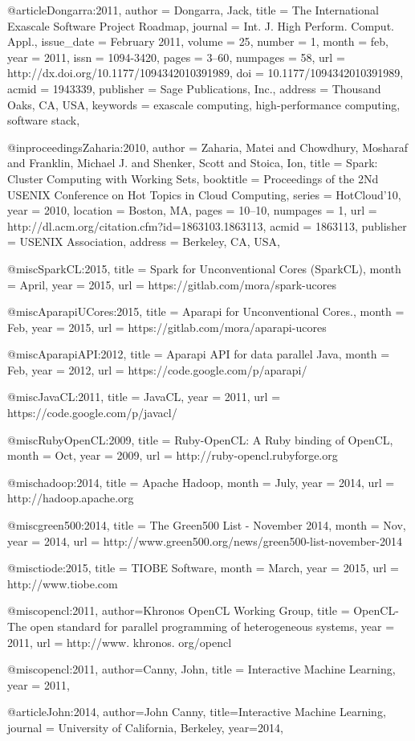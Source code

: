 @article{Dongarra:2011,
 author = {Dongarra, Jack},
 title = {The International Exascale Software Project Roadmap},
 journal = {Int. J. High Perform. Comput. Appl.},
 issue_date = {February  2011},
 volume = {25},
 number = {1},
 month = feb,
 year = {2011},
 issn = {1094-3420},
 pages = {3--60},
 numpages = {58},
 url = {http://dx.doi.org/10.1177/1094342010391989},
 doi = {10.1177/1094342010391989},
 acmid = {1943339},
 publisher = {Sage Publications, Inc.},
 address = {Thousand Oaks, CA, USA},
 keywords = {exascale computing, high-performance computing, software stack},
} 

@inproceedings{Zaharia:2010,
 author = {Zaharia, Matei and Chowdhury, Mosharaf and Franklin, Michael J. and Shenker, Scott and Stoica, Ion},
 title = {Spark: Cluster Computing with Working Sets},
 booktitle = {Proceedings of the 2Nd USENIX Conference on Hot Topics in Cloud Computing},
 series = {HotCloud'10},
 year = {2010},
 location = {Boston, MA},
 pages = {10--10},
 numpages = {1},
 url = {http://dl.acm.org/citation.cfm?id=1863103.1863113},
 acmid = {1863113},
 publisher = {USENIX Association},
 address = {Berkeley, CA, USA},
} 

@misc{SparkCL:2015, 
title = {Spark for Unconventional Cores (SparkCL)},
month = April,
year = {2015},
url = {https://gitlab.com/mora/spark-ucores}
}

@misc{AparapiUCores:2015, 
title = {Aparapi for Unconventional Cores.},
month = Feb,
year = {2015},
url = {https://gitlab.com/mora/aparapi-ucores}
}

@misc{AparapiAPI:2012, 
title = {Aparapi API for data parallel Java},
month = Feb,
year = {2012},
url = {https://code.google.com/p/aparapi/}
}

@misc{JavaCL:2011, 
title = {JavaCL},
year = {2011},
url = {https://code.google.com/p/javacl/}
}

@misc{RubyOpenCL:2009, 
title = {Ruby-OpenCL: A Ruby binding of OpenCL},
month = Oct,
year = {2009},
url = {http://ruby-opencl.rubyforge.org}
}

@misc{hadoop:2014, 
title = {Apache Hadoop},
month = July,
year = {2014},
url = {http://hadoop.apache.org}
}

@misc{green500:2014, 
title = {The Green500 List - November 2014},
month = Nov,
year = {2014},
url = {http://www.green500.org/news/green500-list-november-2014}
}

@misc{tiode:2015, 
title = {TIOBE Software},
month = March,
year = {2015},
url = {http://www.tiobe.com}
}

@misc{opencl:2011, 
author={Khronos OpenCL Working Group},
title = {OpenCL-The open standard for parallel programming of heterogeneous systems},
year = {2011},
url = {http://www. khronos. org/opencl}
}

@misc{opencl:2011, 
author={Canny, John},
title = {Interactive Machine Learning},
year = {2011},
}

@article{John:2014,
author={John Canny},
title={Interactive Machine Learning},
journal = {University of California, Berkeley},
year={2014},
}












